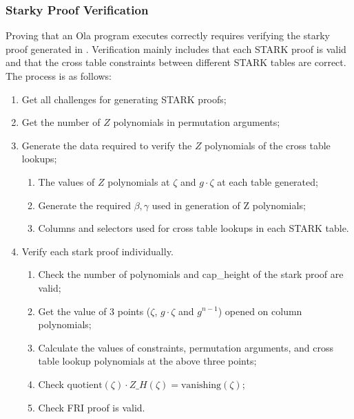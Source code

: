 \subsubsection{Starky Proof Verification}\label{section: starky-verify-proof}

Proving that an Ola program executes correctly requires verifying the starky proof generated in . Verification mainly includes that each STARK proof is valid and that the cross table constraints between different STARK tables are correct. The process is as follows:

\begin{enumerate}
    \item Get all challenges for generating STARK proofs;
    \item Get the number of $Z$ polynomials in permutation arguments;
    \item Generate the data required to verify the $Z$ polynomials of the cross table lookups;
        \begin{enumerate}
            \item The values of $Z$ polynomials at $\zeta$ and $g \cdot \zeta$ at each table generated;
            \item Generate the required $\beta, \gamma$ used in generation of Z polynomials;
            \item Columns and selectors used for cross table lookups in each STARK table.
        \end{enumerate}
    \item Verify each stark proof individually.
        \begin{enumerate}
            \item Check the number of polynomials and cap\_height of the stark proof are valid;
            \item Get the value of 3 points ($\zeta$, $g \cdot \zeta$ and $g^{n-1}$) opened on column polynomials;
            \item Calculate the values of constraints, permutation arguments, and cross table lookup polynomials at the above three points;
            \item Check $\mathrm{quotient}(\zeta) \cdot Z\_H(\zeta) = \mathrm{vanishing}(\zeta)$;
            \item Check FRI proof is valid.
        \end{enumerate}
\end{enumerate}
